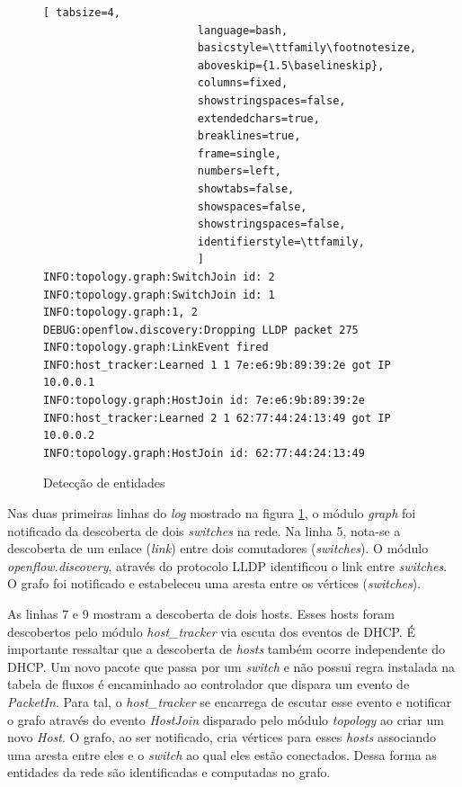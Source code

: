 \begin{figure}[h!]
    \centering
    \begin{lstlisting}[ tabsize=4,  
                        language=bash,
                        basicstyle=\ttfamily\footnotesize,
                        aboveskip={1.5\baselineskip},
                        columns=fixed,
                        showstringspaces=false,
                        extendedchars=true,
                        breaklines=true,
                        frame=single,
                        numbers=left,
                        showtabs=false,
                        showspaces=false,
                        showstringspaces=false,
                        identifierstyle=\ttfamily,
                        ]
INFO:topology.graph:SwitchJoin id: 2
INFO:topology.graph:SwitchJoin id: 1
INFO:topology.graph:1, 2
DEBUG:openflow.discovery:Dropping LLDP packet 275
INFO:topology.graph:LinkEvent fired
INFO:host_tracker:Learned 1 1 7e:e6:9b:89:39:2e got IP 10.0.0.1
INFO:topology.graph:HostJoin id: 7e:e6:9b:89:39:2e
INFO:host_tracker:Learned 2 1 62:77:44:24:13:49 got IP 10.0.0.2
INFO:topology.graph:HostJoin id: 62:77:44:24:13:49
        \end{lstlisting}
    \caption{Detecção de entidades}
    \label{fig:detection}
\end{figure}

Nas duas primeiras linhas do \emph{log} mostrado na figura
\ref{fig:detection}, o módulo \emph{graph} foi notificado
da descoberta de dois \emph{switches} na rede.
Na linha 5, nota-se a descoberta de um enlace (\emph{link}) entre dois
comutadores (\emph{switches}).
O módulo \emph{openflow.discovery}, através do protocolo LLDP identificou 
o link entre \emph{switches}.
O grafo foi notificado e estabeleceu uma aresta entre os 
vértices (\emph{switches}).

As linhas 7 e 9 mostram a descoberta de dois hosts.
Esses hosts foram descobertos pelo módulo \emph{host\_tracker} via 
escuta dos eventos de DHCP.
É importante ressaltar que a descoberta de \emph{hosts} também ocorre 
independente do DHCP.
Um novo pacote que passa por um \emph{switch} e não possui regra
instalada na tabela de fluxos é encaminhado ao controlador que 
dispara um evento de \emph{PacketIn}. 
Para tal, o \emph{host\_tracker} se encarrega de escutar esse evento 
e notificar o grafo através do evento \emph{HostJoin} disparado pelo módulo
\emph{topology} ao criar um novo \emph{Host}.
O grafo, ao ser notificado, cria vértices para esses \emph{hosts} associando 
uma aresta entre eles e o \emph{switch} ao qual eles estão conectados.
Dessa forma as entidades da rede são identificadas e computadas no grafo.


